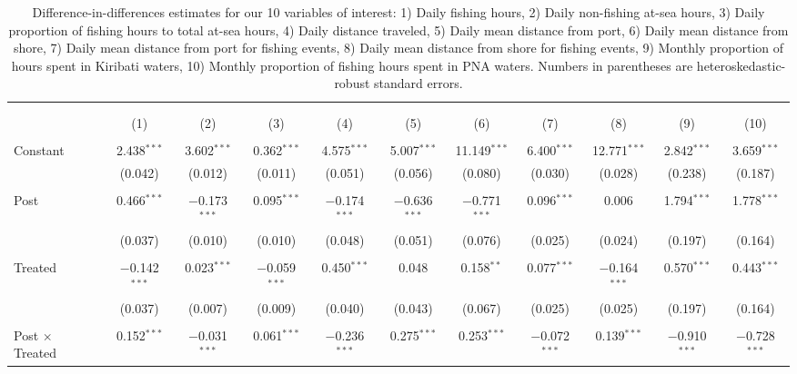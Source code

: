 
\begin{table}[H] \centering 
  \caption{\label{tab:DID_without_PNA}Difference-in-differences estimates for our 10 variables of interest: 1) Daily fishing hours, 2) Daily non-fishing at-sea hours, 3) Daily proportion of fishing hours to total at-sea hours, 4) Daily distance traveled, 5) Daily mean distance from port, 6) Daily mean distance from shore, 7) Daily mean distance from port for fishing events, 8) Daily mean distance from shore for fishing events, 9) Monthly proportion of hours spent in Kiribati waters, 10) Monthly proportion of fishing hours spent in PNA waters. Numbers in parentheses are heteroskedastic-robust standard errors.} 
  \label{} 
\footnotesize 
\begin{tabular}{@{\extracolsep{1pt}}lcccccccccc} 
\\[-1.8ex]\hline 
\hline \\[-1.8ex] 
\\[-1.8ex] & (1) & (2) & (3) & (4) & (5) & (6) & (7) & (8) & (9) & (10)\\ 
\hline \\[-1.8ex] 
 Constant & 2.438$^{***}$ & 3.602$^{***}$ & 0.362$^{***}$ & 4.575$^{***}$ & 5.007$^{***}$ & 11.149$^{***}$ & 6.400$^{***}$ & 12.771$^{***}$ & 2.842$^{***}$ & 3.659$^{***}$ \\ 
  & (0.042) & (0.012) & (0.011) & (0.051) & (0.056) & (0.080) & (0.030) & (0.028) & (0.238) & (0.187) \\ 
  & & & & & & & & & & \\ 
 Post & 0.466$^{***}$ & $-$0.173$^{***}$ & 0.095$^{***}$ & $-$0.174$^{***}$ & $-$0.636$^{***}$ & $-$0.771$^{***}$ & 0.096$^{***}$ & 0.006 & 1.794$^{***}$ & 1.778$^{***}$ \\ 
  & (0.037) & (0.010) & (0.010) & (0.048) & (0.051) & (0.076) & (0.025) & (0.024) & (0.197) & (0.164) \\ 
  & & & & & & & & & & \\ 
 Treated & $-$0.142$^{***}$ & 0.023$^{***}$ & $-$0.059$^{***}$ & 0.450$^{***}$ & 0.048 & 0.158$^{**}$ & 0.077$^{***}$ & $-$0.164$^{***}$ & 0.570$^{***}$ & 0.443$^{***}$ \\ 
  & (0.037) & (0.007) & (0.009) & (0.040) & (0.043) & (0.067) & (0.025) & (0.025) & (0.197) & (0.164) \\ 
  & & & & & & & & & & \\ 
 Post $\times$ Treated & 0.152$^{***}$ & $-$0.031$^{***}$ & 0.061$^{***}$ & $-$0.236$^{***}$ & 0.275$^{***}$ & 0.253$^{***}$ & $-$0.072$^{***}$ & 0.139$^{***}$ & $-$0.910$^{***}$ & $-$0.728$^{***}$ \\ 

\end{tabular}
\end{table}

